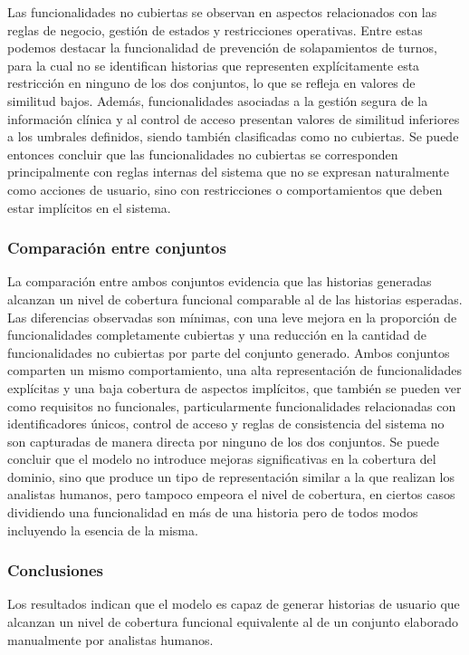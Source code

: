 Las funcionalidades no cubiertas se observan en aspectos relacionados con las reglas de negocio, gestión de estados y restricciones operativas. Entre estas podemos destacar la funcionalidad de prevención de solapamientos de turnos, para la cual no se identifican historias que representen explícitamente esta restricción en ninguno de los dos conjuntos, lo que se refleja en valores de similitud bajos. Además, funcionalidades asociadas a la gestión segura de la información clínica y al control de acceso presentan valores de similitud inferiores a los umbrales definidos, siendo también clasificadas como no cubiertas. Se puede entonces concluir que las funcionalidades no cubiertas se corresponden principalmente con reglas internas del sistema que no se expresan naturalmente como acciones de usuario, sino con restricciones o comportamientos que deben estar implícitos en el sistema.

\subsubsection{Comparación entre conjuntos}
La comparación entre ambos conjuntos evidencia que las historias generadas alcanzan un nivel de cobertura funcional comparable al de las historias esperadas. Las diferencias observadas son mínimas, con una leve mejora en la proporción de funcionalidades completamente cubiertas y una reducción en la cantidad de funcionalidades no cubiertas por parte del conjunto generado.
Ambos conjuntos comparten un mismo comportamiento, una alta representación de funcionalidades explícitas y una baja cobertura de aspectos implícitos, que también se pueden ver como requisitos no funcionales, particularmente funcionalidades relacionadas con identificadores únicos, control de acceso y reglas de consistencia del sistema no son capturadas de manera directa por ninguno de los dos conjuntos. Se puede concluir que el modelo no introduce mejoras significativas en la cobertura del dominio, sino que produce un tipo de representación similar a la que realizan los analistas humanos, pero tampoco empeora el nivel de cobertura, en ciertos casos dividiendo una funcionalidad en más de una historia pero de todos modos incluyendo la esencia de la misma.
\subsubsection{Conclusiones}
Los resultados indican que el modelo es capaz de generar historias de usuario que alcanzan un nivel de cobertura funcional equivalente al de un conjunto elaborado manualmente por analistas humanos.


